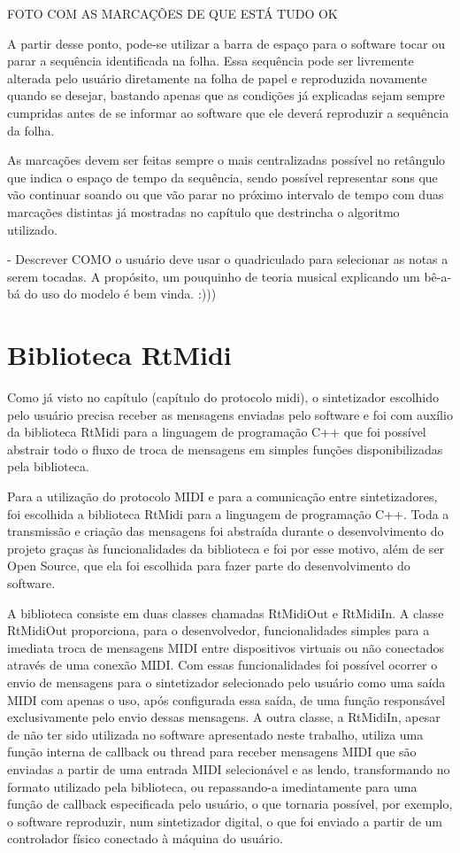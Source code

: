\documentclass[12pt]{report}
\begin{document}
FOTO COM AS MARCAÇÕES DE QUE ESTÁ TUDO OK

A partir desse ponto, pode-se utilizar a barra de espaço para o software tocar ou parar a sequência identificada na folha. Essa sequência pode ser livremente alterada pelo usuário diretamente na folha de papel e reproduzida novamente quando se desejar, bastando apenas que as condições já explicadas sejam sempre cumpridas antes de se informar ao software que ele deverá reproduzir a sequência da folha.

As marcações devem ser feitas sempre o mais centralizadas possível no retângulo que indica o espaço de tempo da sequência, sendo possível representar sons que vão continuar soando ou que vão parar no próximo intervalo de tempo com duas marcações distintas já mostradas no capítulo que destrincha o algoritmo utilizado.

- Descrever COMO o usuário deve usar o quadriculado para selecionar as
notas a serem tocadas. A propósito, um pouquinho de teoria musical
explicando um bê-a-bá do uso do modelo é bem vinda. :)))

\chapter{Biblioteca RtMidi}

Como já visto no capítulo (capítulo do protocolo midi), o sintetizador escolhido pelo usuário precisa receber as mensagens enviadas pelo software e foi com auxílio da biblioteca RtMidi para a linguagem de programação C++ que foi possível abstrair todo o fluxo de troca de mensagens em simples funções disponibilizadas pela biblioteca.

Para a utilização do protocolo MIDI e para a comunicação entre sintetizadores, foi escolhida a biblioteca RtMidi para a linguagem de programação C++. Toda a transmissão e criação das mensagens foi abstraída durante o desenvolvimento do projeto graças às funcionalidades da biblioteca e foi por esse motivo, além de ser Open Source, que ela foi escolhida para fazer parte do desenvolvimento do software.

A biblioteca consiste em duas classes chamadas RtMidiOut e RtMidiIn. A classe RtMidiOut proporciona, para o desenvolvedor, funcionalidades simples para a imediata troca de mensagens MIDI entre dispositivos virtuais ou não conectados através de uma conexão MIDI. Com essas funcionalidades foi possível ocorrer o envio de mensagens para o sintetizador selecionado pelo usuário como uma saída MIDI com apenas o uso, após configurada essa saída, de uma função responsável exclusivamente pelo envio dessas mensagens. A outra classe, a RtMidiIn, apesar de não ter sido utilizada no software apresentado neste trabalho, utiliza uma função interna de callback ou thread para receber mensagens MIDI que são enviadas a partir de uma entrada MIDI selecionável e as lendo, transformando no formato utilizado pela biblioteca, ou repassando-a imediatamente para uma função de callback especificada pelo usuário, o que tornaria possível, por exemplo, o software reproduzir, num sintetizador digital, o que foi enviado a partir de um controlador físico conectado à máquina do usuário.
\end{document}
